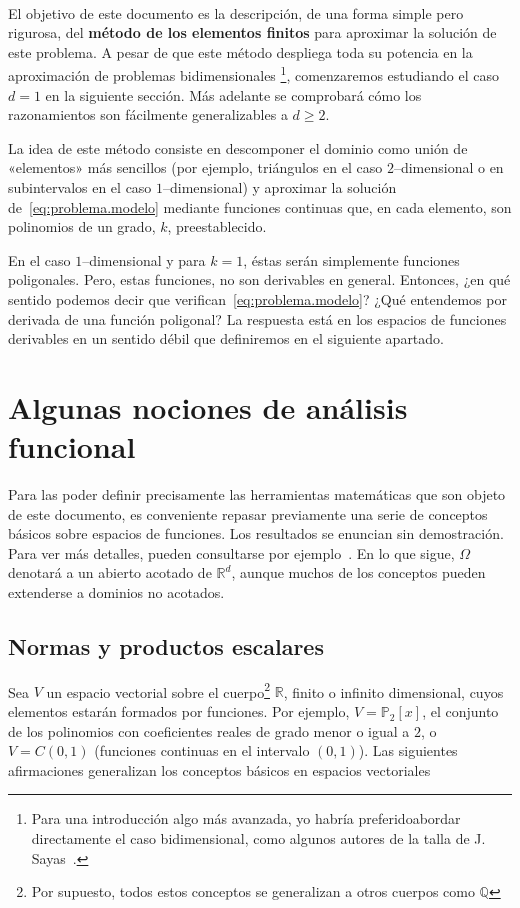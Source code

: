 \documentclass[11pt]{article}
\theoremstyle{plain}
\theoremstyle{definition}
\newcounter{stepnum}[section]
\newcommand{\step}[1][]{\bigskip\noindent\textbf{\thesection.\refstepcounter{stepnum}\thestepnum}.\enspace{#1}}
\renewcommand{\step}[1][]{\paragraph{#1}\hspace{-1.1em}}
\newcommand{\Q}{\ensuremath{\mathbb{Q}}}
\newcommand{\R}{\ensuremath{\mathbb{R}}}
\renewcommand{\P}{\ensuremath{\mathbb{P}}}
\begin{document}
\step

El objetivo de este documento es la descripción,  de una forma simple pero rigurosa, del \textbf{método de los elementos finitos} para aproximar la solución de este problema. 
A pesar de que este método despliega toda su potencia en la aproximación de problemas bidimensionales%
\footnote{Para una introducción algo más avanzada, yo habría preferidoabordar directamente el caso bidimensional, como algunos autores de la talla de J. Sayas~\cite{sayas2008gentle}.}, %
comenzaremos estudiando el caso $d=1$ en la siguiente sección. Más adelante se comprobará cómo los razonamientos son fácilmente generalizables  a $d\geq 2$.

La idea de este método consiste en descomponer el dominio como unión de «elementos» más sencillos (por ejemplo, triángulos en el caso $2$--dimensional o en subintervalos en el caso $1$--dimensional) y aproximar la solución de~\eqref{eq:problema.modelo} mediante funciones continuas que, en cada elemento, son polinomios de un grado, $k$, preestablecido. 

En el caso $1$--dimensional y para $k=1$, éstas serán simplemente funciones poligonales. Pero, estas funciones, no son derivables en general. Entonces, ¿en qué sentido podemos decir que verifican~\eqref{eq:problema.modelo}? ¿Qué entendemos por derivada de una función poligonal? La respuesta está en los espacios de funciones derivables en un sentido débil que definiremos en el siguiente apartado.

\section{Algunas nociones de análisis funcional}
\label{sec:análisis.funcional}

Para las poder definir precisamente las herramientas matemáticas que son objeto de este documento, es conveniente repasar previamente una serie de conceptos básicos sobre espacios de funciones. Los resultados se enuncian sin demostración. Para ver más detalles, pueden consultarse por ejemplo~\cite{adams2003sobolev, sayas2019variational}. En lo que sigue, $\Omega$ denotará a un abierto acotado de $\R^d$, aunque muchos de los conceptos pueden extenderse a dominios no acotados.

\subsection*{Normas y productos escalares}
Sea $V$ un espacio vectorial sobre el cuerpo\footnote{Por supuesto, todos estos conceptos se generalizan a otros cuerpos como $\Q$} $\R$, finito o infinito dimensional, cuyos elementos estarán formados por funciones. Por ejemplo, $V=\P_2[x]$, el conjunto de los polinomios con coeficientes reales de grado menor o igual a $2$, o $V=C(0,1)$ (funciones continuas en el intervalo $(0,1)$). Las siguientes afirmaciones generalizan los conceptos básicos en espacios vectoriales  
\end{document}
